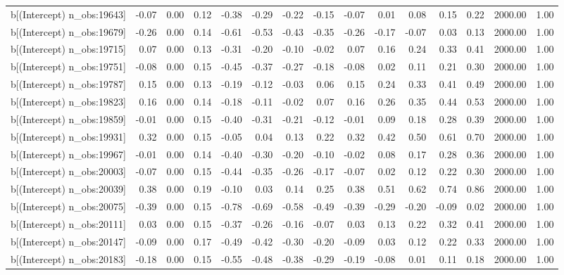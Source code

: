 \begin{table}[ht]
\begin{tabular}{rrrrrrrrrrrrrrr}
  b[(Intercept) n\_obs:19643] & -0.07 & 0.00 & 0.12 & -0.38 & -0.29 & -0.22 & -0.15 & -0.07 & 0.01 & 0.08 & 0.15 & 0.22 & 2000.00 & 1.00 \\ 
  b[(Intercept) n\_obs:19679] & -0.26 & 0.00 & 0.14 & -0.61 & -0.53 & -0.43 & -0.35 & -0.26 & -0.17 & -0.07 & 0.03 & 0.13 & 2000.00 & 1.00 \\ 
  b[(Intercept) n\_obs:19715] & 0.07 & 0.00 & 0.13 & -0.31 & -0.20 & -0.10 & -0.02 & 0.07 & 0.16 & 0.24 & 0.33 & 0.41 & 2000.00 & 1.00 \\ 
  b[(Intercept) n\_obs:19751] & -0.08 & 0.00 & 0.15 & -0.45 & -0.37 & -0.27 & -0.18 & -0.08 & 0.02 & 0.11 & 0.21 & 0.30 & 2000.00 & 1.00 \\ 
  b[(Intercept) n\_obs:19787] & 0.15 & 0.00 & 0.13 & -0.19 & -0.12 & -0.03 & 0.06 & 0.15 & 0.24 & 0.33 & 0.41 & 0.49 & 2000.00 & 1.00 \\ 
  b[(Intercept) n\_obs:19823] & 0.16 & 0.00 & 0.14 & -0.18 & -0.11 & -0.02 & 0.07 & 0.16 & 0.26 & 0.35 & 0.44 & 0.53 & 2000.00 & 1.00 \\ 
  b[(Intercept) n\_obs:19859] & -0.01 & 0.00 & 0.15 & -0.40 & -0.31 & -0.21 & -0.12 & -0.01 & 0.09 & 0.18 & 0.28 & 0.39 & 2000.00 & 1.00 \\ 
  b[(Intercept) n\_obs:19931] & 0.32 & 0.00 & 0.15 & -0.05 & 0.04 & 0.13 & 0.22 & 0.32 & 0.42 & 0.50 & 0.61 & 0.70 & 2000.00 & 1.00 \\ 
  b[(Intercept) n\_obs:19967] & -0.01 & 0.00 & 0.14 & -0.40 & -0.30 & -0.20 & -0.10 & -0.02 & 0.08 & 0.17 & 0.28 & 0.36 & 2000.00 & 1.00 \\ 
  b[(Intercept) n\_obs:20003] & -0.07 & 0.00 & 0.15 & -0.44 & -0.35 & -0.26 & -0.17 & -0.07 & 0.02 & 0.12 & 0.22 & 0.30 & 2000.00 & 1.00 \\ 
  b[(Intercept) n\_obs:20039] & 0.38 & 0.00 & 0.19 & -0.10 & 0.03 & 0.14 & 0.25 & 0.38 & 0.51 & 0.62 & 0.74 & 0.86 & 2000.00 & 1.00 \\ 
  b[(Intercept) n\_obs:20075] & -0.39 & 0.00 & 0.15 & -0.78 & -0.69 & -0.58 & -0.49 & -0.39 & -0.29 & -0.20 & -0.09 & 0.02 & 2000.00 & 1.00 \\ 
  b[(Intercept) n\_obs:20111] & 0.03 & 0.00 & 0.15 & -0.37 & -0.26 & -0.16 & -0.07 & 0.03 & 0.13 & 0.22 & 0.32 & 0.41 & 2000.00 & 1.00 \\ 
  b[(Intercept) n\_obs:20147] & -0.09 & 0.00 & 0.17 & -0.49 & -0.42 & -0.30 & -0.20 & -0.09 & 0.03 & 0.12 & 0.22 & 0.33 & 2000.00 & 1.00 \\ 
  b[(Intercept) n\_obs:20183] & -0.18 & 0.00 & 0.15 & -0.55 & -0.48 & -0.38 & -0.29 & -0.19 & -0.08 & 0.01 & 0.11 & 0.18 & 2000.00 & 1.00 \\ 

\end{tabular}
\end{table}

